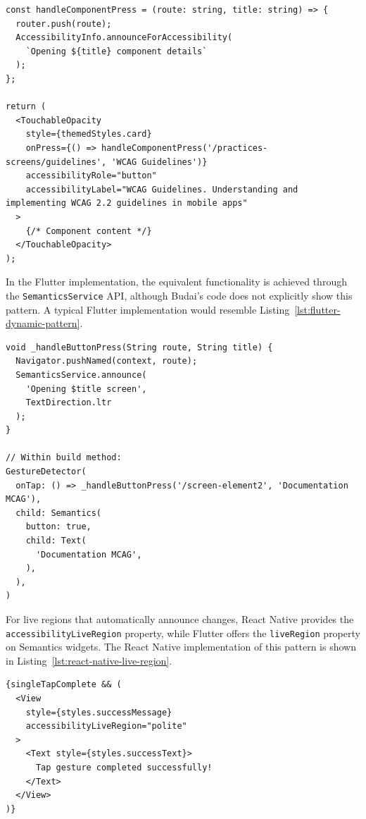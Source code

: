 {\begin{lstlisting}[style=ReactNativeStyle, caption=Dynamic content announcement in React Native, label=lst:react-native-dynamic-pattern]
const handleComponentPress = (route: string, title: string) => {
  router.push(route);
  AccessibilityInfo.announceForAccessibility(
    `Opening ${title} component details`
  );
};

return (
  <TouchableOpacity
    style={themedStyles.card}
    onPress={() => handleComponentPress('/practices-screens/guidelines', 'WCAG Guidelines')}
    accessibilityRole="button"
    accessibilityLabel="WCAG Guidelines. Understanding and implementing WCAG 2.2 guidelines in mobile apps"
  >
    {/* Component content */}
  </TouchableOpacity>
);
\end{lstlisting}

\pagebreak

In the Flutter implementation, the equivalent functionality is achieved through the \texttt{SemanticsService} API, although Budai's code does not explicitly show this pattern. A typical Flutter implementation would resemble Listing~\ref{lst:flutter-dynamic-pattern}.

\begin{lstlisting}[style=DartStyle, caption=Dynamic content announcement in Flutter, label=lst:flutter-dynamic-pattern]
void _handleButtonPress(String route, String title) {
  Navigator.pushNamed(context, route);
  SemanticsService.announce(
    'Opening $title screen',
    TextDirection.ltr
  );
}

// Within build method:
GestureDetector(
  onTap: () => _handleButtonPress('/screen-element2', 'Documentation MCAG'),
  child: Semantics(
    button: true,
    child: Text(
      'Documentation MCAG',
    ),
  ),
)
\end{lstlisting}

\pagebreak

For live regions that automatically announce changes, React Native provides the \\ \texttt{accessibilityLiveRegion} property, while Flutter offers the \texttt{liveRegion} property on Semantics widgets. The React Native implementation of this pattern is shown in Listing~\ref{lst:react-native-live-region}.

\begin{lstlisting}[style=ReactNativeStyle, caption=Live region announcement in React Native, label=lst:react-native-live-region]
{singleTapComplete && (
  <View 
    style={styles.successMessage} 
    accessibilityLiveRegion="polite"
  >
    <Text style={styles.successText}>
      Tap gesture completed successfully!
    </Text>
  </View>
)}
\end{lstlisting}

}
